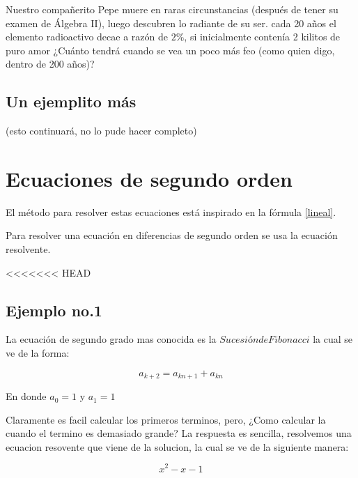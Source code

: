 \documentclass{article}
\begin{document}
Nuestro compañerito Pepe muere en raras circunstancias (después de tener su examen de Álgebra II), luego descubren lo radiante de su ser. cada 20 años el elemento radioactivo decae a razón de $2\%$, si inicialmente contenía 2 kilitos de puro amor ¿Cuánto tendrá cuando se vea un poco más feo (como quien digo, dentro de 200 años)?


\subsection{Un ejemplito más}

(esto continuará, no lo pude hacer completo)


\section{Ecuaciones de segundo orden}

El método para resolver estas ecuaciones está inspirado en la fórmula \ref{lineal}.

Para resolver una ecuación en diferencias de segundo orden se usa la ecuación resolvente.

<<<<<<< HEAD
\subsection{Ejemplo no.1}

La ecuación de segundo grado mas conocida es la $Sucesión de Fibonacci$ la cual se ve de la forma:

$$a_{k+2}=a_{kn+1}+a_{kn}$$
 
En donde $a_{0}=1$ y $a_{1}=1$

Claramente es facil calcular los primeros terminos, pero, ¿Como calcular la cuando el termino es demasiado grande?
La respuesta es sencilla, resolvemos una ecuacion resovente que viene de la solucion, la cual se ve de la siguiente manera:

$$x^2-x-1$$
\end{document}
